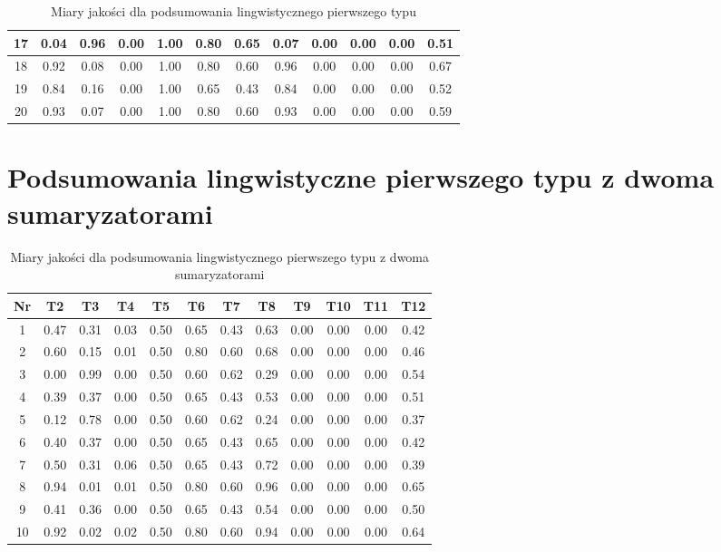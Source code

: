 \documentclass{article}
\begin{document}
\begin{table}[h!]
\begin{tabular}{|c|c|c|c|c|c|c|c|c|c|c|c|}
    \hline
    17 & 0.04 & 0.96 & 0.00 & 1.00 & 0.80 & 0.65 & 0.07 & 0.00 & 0.00 & 0.00 & 0.51 \\
    \hline
    18 & 0.92 & 0.08 & 0.00 & 1.00 & 0.80 & 0.60 & 0.96 & 0.00 & 0.00 & 0.00 & 0.67 \\
    \hline
    19 & 0.84 & 0.16 & 0.00 & 1.00 & 0.65 & 0.43 & 0.84 & 0.00 & 0.00 & 0.00 & 0.52 \\
    \hline
    20 & 0.93 & 0.07 & 0.00 & 1.00 & 0.80 & 0.60 & 0.93 & 0.00 & 0.00 & 0.00 & 0.59 \\
    \hline
    \end{tabular}
    \caption{Miary jakości dla podsumowania lingwistycznego pierwszego typu}
    \end{table}

    \section{Podsumowania lingwistyczne pierwszego typu z dwoma sumaryzatorami}
    \begin{table}[h!]
    \centering
    \begin{tabular}{|c|c|c|c|c|c|c|c|c|c|c|c|}
    \hline
    Nr & T2 & T3 & T4 & T5 & T6 & T7 & T8 & T9 & T10 & T11 & T12 \\
    \hline
    1 & 0.47 & 0.31 & 0.03 & 0.50 & 0.65 & 0.43 & 0.63 & 0.00 & 0.00 & 0.00 & 0.42 \\
    \hline
    2 & 0.60 & 0.15 & 0.01 & 0.50 & 0.80 & 0.60 & 0.68 & 0.00 & 0.00 & 0.00 & 0.46 \\
    \hline
    3 & 0.00 & 0.99 & 0.00 & 0.50 & 0.60 & 0.62 & 0.29 & 0.00 & 0.00 & 0.00 & 0.54 \\
    \hline
    4 & 0.39 & 0.37 & 0.00 & 0.50 & 0.65 & 0.43 & 0.53 & 0.00 & 0.00 & 0.00 & 0.51 \\
    \hline
    5 & 0.12 & 0.78 & 0.00 & 0.50 & 0.60 & 0.62 & 0.24 & 0.00 & 0.00 & 0.00 & 0.37 \\
    \hline
    6 & 0.40 & 0.37 & 0.00 & 0.50 & 0.65 & 0.43 & 0.65 & 0.00 & 0.00 & 0.00 & 0.42 \\
    \hline
    7 & 0.50 & 0.31 & 0.06 & 0.50 & 0.65 & 0.43 & 0.72 & 0.00 & 0.00 & 0.00 & 0.39 \\
    \hline
    8 & 0.94 & 0.01 & 0.01 & 0.50 & 0.80 & 0.60 & 0.96 & 0.00 & 0.00 & 0.00 & 0.65 \\
    \hline
    9 & 0.41 & 0.36 & 0.00 & 0.50 & 0.65 & 0.43 & 0.54 & 0.00 & 0.00 & 0.00 & 0.50 \\
    \hline
    10 & 0.92 & 0.02 & 0.02 & 0.50 & 0.80 & 0.60 & 0.94 & 0.00 & 0.00 & 0.00 & 0.64 \\
    \hline
    \end{tabular}
    \caption{Miary jakości dla podsumowania lingwistycznego pierwszego typu z dwoma sumaryzatorami}
    \end{table}
\end{document}
